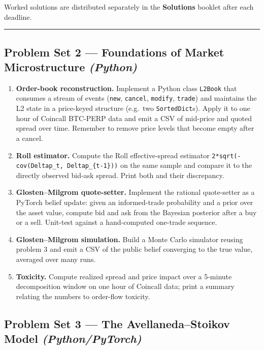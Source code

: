 \documentclass[
]{article}
\providecommand{\tightlist}{%
  \setlength{\itemsep}{0pt}\setlength{\parskip}{0pt}}
\begin{document}
Worked solutions are distributed separately in the \textbf{Solutions}
booklet after each deadline.

\begin{center}\rule{0.5\linewidth}{0.5pt}\end{center}

\subsection{\texorpdfstring{Problem Set 2 --- Foundations of Market
Microstructure
\emph{(Python)}}{Problem Set 2 --- Foundations of Market Microstructure (Python)}}\label{problem-set-2-foundations-of-market-microstructure-python}

\begin{enumerate}
\def\labelenumi{\arabic{enumi}.}
\tightlist
\item
  \textbf{Order-book reconstruction.} Implement a Python class
  \texttt{L2Book} that consumes a stream of events (\texttt{new},
  \texttt{cancel}, \texttt{modify}, \texttt{trade}) and maintains the L2
  state in a price-keyed structure (e.g.~two \texttt{SortedDict}s).
  Apply it to one hour of Coincall BTC-PERP data and emit a CSV of
  mid-price and quoted spread over time. Remember to remove price levels
  that become empty after a cancel.
\item
  \textbf{Roll estimator.} Compute the Roll effective-spread estimator
  \texttt{2*sqrt(-cov(Deltap\_t,\ Deltap\_\{t-1\}))} on the same sample
  and compare it to the directly observed bid-ask spread. Print both and
  their discrepancy.
\item
  \textbf{Glosten--Milgrom quote-setter.} Implement the rational
  quote-setter as a PyTorch belief update: given an informed-trade
  probability and a prior over the asset value, compute bid and ask from
  the Bayesian posterior after a buy or a sell. Unit-test against a
  hand-computed one-trade sequence.
\item
  \textbf{Glosten--Milgrom simulation.} Build a Monte Carlo simulator
  reusing problem 3 and emit a CSV of the public belief converging to
  the true value, averaged over many runs.
\item
  \textbf{Toxicity.} Compute realized spread and price impact over a
  5-minute decomposition window on one hour of Coincall data; print a
  summary relating the numbers to order-flow toxicity.
\end{enumerate}

\subsection{\texorpdfstring{Problem Set 3 --- The Avellaneda--Stoikov
Model
\emph{(Python/PyTorch)}}{Problem Set 3 --- The Avellaneda--Stoikov Model (Python/PyTorch)}}\label{problem-set-3-the-avellanedastoikov-model-pythonpytorch}
\end{document}
